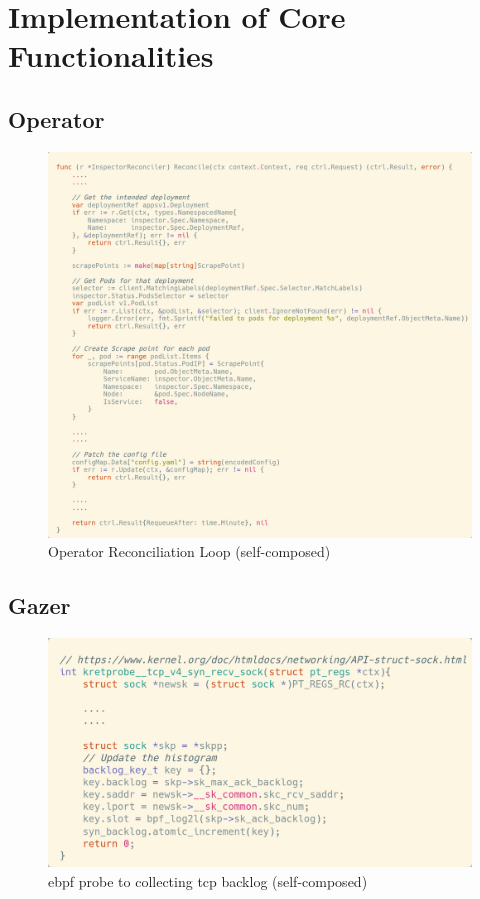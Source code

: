 \section{Implementation of Core Functionalities}

\subsection{Operator}

\begin{figure}[H]
    \includegraphics[width=14cm]{assets/implementation/reconcile-loop.png}
    \caption{Operator Reconciliation Loop (self-composed)}
    \label{fig:reconcile-loop}
\end{figure}

\subsection{Gazer}

\begin{figure}[H]
    \includegraphics[width=14cm]{assets/implementation/backlog-probe.png}
    \caption{\ac{ebpf} probe to collecting tcp backlog (self-composed)}
    \label{fig:backlog-probe}
\end{figure}

